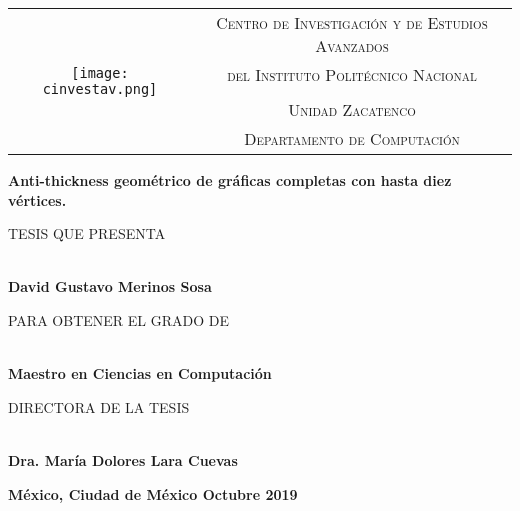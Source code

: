 \thispagestyle{empty}

\begin{tabular}{cc}
\multirow{5}{*}{\texttt{[image: cinvestav.png]}} & \textsc{Centro de Investigaci\'on y de Estudios Avanzados} \\
  & \textsc{del Instituto Polit\'ecnico Nacional} \\
  & \\
  & \textsc{Unidad Zacatenco} \\
  & \textsc{Departamento de Computaci\'on} \\
\end{tabular}

\vspace{2cm}

\begin{center}
{
  \textbf{\Large Anti-thickness geométrico de gráficas completas con hasta diez vértices.}\\

  {\large
    \vspace{2cm}
    \begin{small} TESIS QUE PRESENTA \end{small} \\
    \textbf{David Gustavo Merinos Sosa} \\

    \vspace{1cm}
    \begin{small} PARA OBTENER EL GRADO DE \end{small} \\
    \textbf{Maestro en Ciencias en Computaci\'on} \\

    \vspace{2cm}
    \begin{small} DIRECTORA DE LA TESIS \end{small}\\
    \textbf{Dra. María Dolores Lara Cuevas} \\
  }
}
\end{center}

\vfill

\textbf{M\'exico, Ciudad de M\'exico \hfill Octubre 2019}
\newpage
